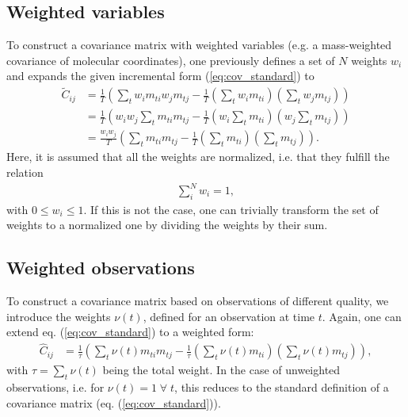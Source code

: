 \documentclass[a4paper]{article}
\begin{document}
\subsection{Weighted variables}
To construct a covariance matrix with weighted variables (e.g. a mass-weighted covariance of molecular coordinates),
one previously defines a set of $N$ weights $w_i$ and expands the given incremental form (\ref{eq:cov_standard}) to
\begin{align}
  \tilde{C}_{ij} &= \frac{1}{T}\left( \sum_t w_i m_{ti} w_j m_{tj} - \frac{1}{T} \left(\sum_t w_i m_{ti}\right) \left(\sum_t w_j m_{tj}\right) \right)\\
                 &= \frac{1}{T}\left( w_i w_j \sum_t m_{ti} m_{tj} - \frac{1}{T} \left(w_i \sum_t m_{ti}\right) \left(w_j \sum_t m_{tj}\right) \right)\\
                 &= \frac{w_i w_j}{T}\left(\sum_t m_{ti} m_{tj} - \frac{1}{T} \left(\sum_t m_{ti}\right) \left(\sum_t m_{tj}\right) \right).
\end{align}
Here, it is assumed that all the weights are normalized, i.e. that they fulfill the relation
\begin{align}
  \sum_i^N w_i = 1,
\end{align}
with $0 \le w_i \le 1$.
If this is not the case, one can trivially transform the set of weights to a normalized one by dividing the weights by their sum.

\subsection{Weighted observations}
To construct a covariance matrix based on observations of different quality, we introduce the weights $\nu\left(t\right)$, defined
for an observation at time $t$.
Again, one can extend eq. (\ref{eq:cov_standard}) to a weighted form:
\begin{align}
  \hat{C}_{ij} &= \frac{1}{\tau}\left( \sum_t \nu\left(t\right) m_{ti} m_{tj}
                   - \frac{1}{\tau} \left(\sum_t \nu\left(t\right) m_{ti}\right) \left(\sum_t \nu\left(t\right) m_{tj}\right) \right),
\end{align}
with $\tau = \sum_t \nu\left(t\right)$ being the total weight.
In the case of unweighted observations, i.e. for $\nu\left(t\right) = 1 \; \forall \; t$, this reduces to the standard definition
of a covariance matrix (eq. (\ref{eq:cov_standard})).
\end{document}

